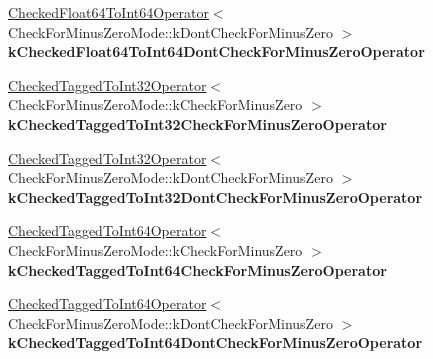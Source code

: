 \begin{DoxyCompactItemize}
\mbox{\label{structv8_1_1internal_1_1compiler_1_1SimplifiedOperatorGlobalCache_a5717229ebb4cf5b6fa9ff0b8edc1184a}} 
\mbox{\hyperlink{structv8_1_1internal_1_1compiler_1_1SimplifiedOperatorGlobalCache_1_1CheckedFloat64ToInt64Operator}{Checked\+Float64\+To\+Int64\+Operator}}$<$ Check\+For\+Minus\+Zero\+Mode\+::k\+Dont\+Check\+For\+Minus\+Zero $>$ {\bfseries k\+Checked\+Float64\+To\+Int64\+Dont\+Check\+For\+Minus\+Zero\+Operator}
\item 
\mbox{\label{structv8_1_1internal_1_1compiler_1_1SimplifiedOperatorGlobalCache_aad0cd255f29dca8b96fc4d1f1985de6b}} 
\mbox{\hyperlink{structv8_1_1internal_1_1compiler_1_1SimplifiedOperatorGlobalCache_1_1CheckedTaggedToInt32Operator}{Checked\+Tagged\+To\+Int32\+Operator}}$<$ Check\+For\+Minus\+Zero\+Mode\+::k\+Check\+For\+Minus\+Zero $>$ {\bfseries k\+Checked\+Tagged\+To\+Int32\+Check\+For\+Minus\+Zero\+Operator}
\item 
\mbox{\label{structv8_1_1internal_1_1compiler_1_1SimplifiedOperatorGlobalCache_a4a6009ae4354a7d9520cb51ea6b623bc}} 
\mbox{\hyperlink{structv8_1_1internal_1_1compiler_1_1SimplifiedOperatorGlobalCache_1_1CheckedTaggedToInt32Operator}{Checked\+Tagged\+To\+Int32\+Operator}}$<$ Check\+For\+Minus\+Zero\+Mode\+::k\+Dont\+Check\+For\+Minus\+Zero $>$ {\bfseries k\+Checked\+Tagged\+To\+Int32\+Dont\+Check\+For\+Minus\+Zero\+Operator}
\item 
\mbox{\label{structv8_1_1internal_1_1compiler_1_1SimplifiedOperatorGlobalCache_a79cad95251fac7f670c3e32403393c60}} 
\mbox{\hyperlink{structv8_1_1internal_1_1compiler_1_1SimplifiedOperatorGlobalCache_1_1CheckedTaggedToInt64Operator}{Checked\+Tagged\+To\+Int64\+Operator}}$<$ Check\+For\+Minus\+Zero\+Mode\+::k\+Check\+For\+Minus\+Zero $>$ {\bfseries k\+Checked\+Tagged\+To\+Int64\+Check\+For\+Minus\+Zero\+Operator}
\item 
\mbox{\label{structv8_1_1internal_1_1compiler_1_1SimplifiedOperatorGlobalCache_afc468a5a1fa0248389258affaf5ee9f0}} 
\mbox{\hyperlink{structv8_1_1internal_1_1compiler_1_1SimplifiedOperatorGlobalCache_1_1CheckedTaggedToInt64Operator}{Checked\+Tagged\+To\+Int64\+Operator}}$<$ Check\+For\+Minus\+Zero\+Mode\+::k\+Dont\+Check\+For\+Minus\+Zero $>$ {\bfseries k\+Checked\+Tagged\+To\+Int64\+Dont\+Check\+For\+Minus\+Zero\+Operator}

\end{DoxyCompactItemize}
